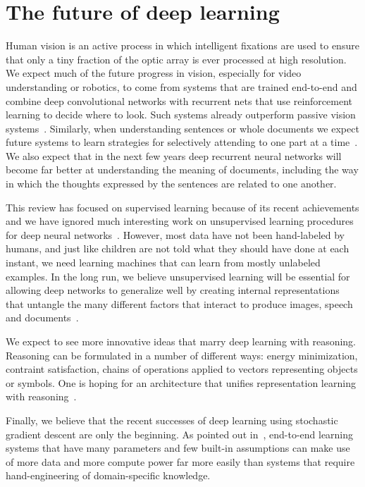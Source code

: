 \documentclass[10pts]{article}
\begin{document}
\section{The future of deep learning}

Human vision is an active process in which intelligent fixations are
used to ensure that only a tiny fraction of the optic array is ever
processed at high resolution. We expect much of the future progress in
vision, especially for video understanding or robotics, to come from
systems that are trained end-to-end and combine deep convolutional
networks with recurrent nets that use reinforcement learning to decide
where to look.  Such systems already outperform passive vision
systems~\citep{ba+mnih}.  Similarly, when understanding sentences or
whole documents we expect future systems to learn strategies for
selectively attending to one part at a
time~\citep{Bahdanau-et-al-arxiv2014}. We also expect that in the next
few years deep recurrent neural networks will become far better at
understanding the meaning of documents, including the way in which the
thoughts expressed by the sentences are related to one another.

This review has focused on supervised learning because of its recent
achievements and we have ignored much interesting work on unsupervised
learning procedures for deep neural
networks~\citep{Salakhutdinov2009-small,Hinton95,QuocLe-ICML2012,VincentPLarochelleH2008-small,koray-nips-10,gregor-icml-10,ranzato-pami,Bengio-et-al-ICML-2014,Kingma-et-al-NIPS2014}.
However, most data have not been hand-labeled by humans, and just like
children are not told what they should have done at each instant, we
need learning machines that can learn from mostly unlabeled examples.
In the long run, we believe unsupervised learning will be essential
for allowing deep networks to generalize well by creating internal
representations that untangle the many different factors that interact
to produce images, speech and
documents~\citep{Bengio-Courville-Vincent-TPAMI2013}.

We expect to see more innovative ideas that marry deep learning with
reasoning. Reasoning can be formulated in a number of different ways:
energy minimization, contraint satisfaction, chains of operations
applied to vectors representing objects or symbols. One is hoping for
an architecture that unifies representation learning with
reasoning~\citep{bottou-mlj-2014}.

Finally, we believe that the recent successes of deep learning using
stochastic gradient descent are only the beginning.  As pointed out
in~\citet{Bengio+Lecun-chapter2007-small}, end-to-end learning
systems that have many parameters and few built-in assumptions can make use
of more data and more compute power far more easily than systems that
require hand-engineering of domain-specific knowledge.
\end{document}
